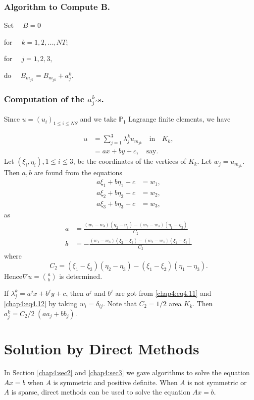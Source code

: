 \subsubsection{\bf Algorithm to Compute B.}

\hspace{.5cm} Set $\quad B=0$

for $\quad k=1, 2,\ldots, NT$;

for $\quad j=1, 2, 3$,

do $\quad B_{m_{jk}}=B_{m_{jk}}+a_j^k$.

\subsubsection{\bf Computation of the ${a_j^k}{}_{'}s$.} Since
$u=(u_i)_{1\leq i\leq NS}$ and we take $\mathbb{P}_1$ Lagrange finite
elements, we have 

\begin{align*}
u &= \sum\limits_{j=1}^3\lambda_j^k u_{m_{jk}}\quad\text{in}\quad
K_k,\\
&= ax+by+c,\quad\text{say}.
\end{align*}
Let $(\xi_i,\eta_i), 1\leq i\leq 3$, be the coordinates of the
vertices of $K_k$. Let $w_j=u_{m_{jk}}$. Then $a, b$ are found from
the equations
\begin{equation}
\begin{split}\label{chap4:eq4.10}
a\xi_1 + b\eta_1 + c &= w_1,\\
a\xi_2 + b\eta_2 + c &= w_2,\\
a\xi_3 + b\eta_3 + c &= w_3,
\end{split}
\end{equation}
as 
\begin{align} 
a &=
\frac{(w_1-w_3)(\eta_2-\eta_3)-(w_2-w_3)(\eta_1-\eta_3)}{C_2}\label{chap4:eq4.11}
\\
b &= -\frac{(w_1-w_3)(\xi_2-\xi_3)-(w_2-w_3)(\xi_1-\xi_3)}{C_2}\label{chap4:eq4.12}
\end{align}
where
$$
C_2=(\xi_1-\xi_3)(\eta_2-\eta_3)-(\xi_1-\xi_2)(\eta_1-\eta_3).
$$
Hence\pageoriginale $\nabla u=\binom{a}{b}$ is determined. 

If $\lambda_j^k=a^jx+b^jy+c$, then $a^j$ and $b^j$ are got from
\eqref{chap4:eq4.11} and \eqref{chap4:eq4.12} by taking
$w_i=\delta_{ij}$. Note that $C_2=1/2$ area $K_k$. Then
$a_j^k=C_2/2\;(aa_j+bb_j)$. 

\section{Solution by Direct Methods}\label{chap4:ssec4.6} 
In Section \ref{chap4:sec2} and \ref{chap4:sec3} we gave algorithms to
solve the equation $Ax=b$ when $A$ is symmetric and positive
definite. When $A$ is not symmetric or $A$ is sparse, direct methods
can be used to solve the equation $Ax=b$.

